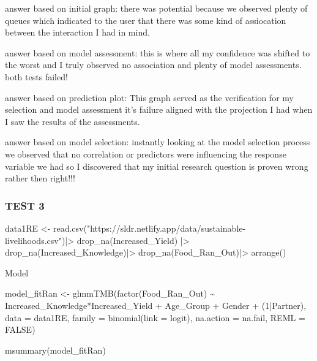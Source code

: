 \documentclass[
]{article}
\newenvironment{Shaded}{\begin{snugshade}}{\end{snugshade}}
\newcommand{\AttributeTok}[1]{\textcolor[rgb]{0.77,0.63,0.00}{#1}}
\newcommand{\ConstantTok}[1]{\textcolor[rgb]{0.00,0.00,0.00}{#1}}
\newcommand{\DecValTok}[1]{\textcolor[rgb]{0.00,0.00,0.81}{#1}}
\newcommand{\FunctionTok}[1]{\textcolor[rgb]{0.00,0.00,0.00}{#1}}
\newcommand{\NormalTok}[1]{#1}
\newcommand{\OtherTok}[1]{\textcolor[rgb]{0.56,0.35,0.01}{#1}}
\newcommand{\SpecialCharTok}[1]{\textcolor[rgb]{0.00,0.00,0.00}{#1}}
\newcommand{\StringTok}[1]{\textcolor[rgb]{0.31,0.60,0.02}{#1}}
\begin{document}
answer based on initial graph: there was potential because we observed
plenty of queues which indicated to the user that there was some kind of
assiocation between the interaction I had in mind.

answer based on model assessment: this is where all my confidence was
shifted to the worst and I truly observed no association and plenty of
model assessments. both tests failed!

answer based on prediction plot: This graph served as the verification
for my selection and model assessment it's failure aligned with the
projection I had when I saw the results of the assessments.

answer based on model selection: instantly looking at the model
selection process we observed that no correlation or predictors were
influencing the response variable we had so I discovered that my initial
research question is proven wrong rather then right!!!

\hypertarget{test-3}{%
\subsubsection{TEST 3}\label{test-3}}

\begin{Shaded}
\begin{Highlighting}[]
\NormalTok{data1RE }\OtherTok{\textless{}{-}} \FunctionTok{read.csv}\NormalTok{(}\StringTok{"https://sldr.netlify.app/data/sustainable{-}livelihoods.csv"}\NormalTok{)}\SpecialCharTok{|\textgreater{}}
  \FunctionTok{drop\_na}\NormalTok{(Increased\_Yield) }\SpecialCharTok{|\textgreater{}}
  \FunctionTok{drop\_na}\NormalTok{(Increased\_Knowledge)}\SpecialCharTok{|\textgreater{}}
  \FunctionTok{drop\_na}\NormalTok{(Food\_Ran\_Out)}\SpecialCharTok{|\textgreater{}}
  \FunctionTok{arrange}\NormalTok{()}
\end{Highlighting}
\end{Shaded}

Model

\begin{Shaded}
\begin{Highlighting}[]
\NormalTok{model\_fitRan }\OtherTok{\textless{}{-}} \FunctionTok{glmmTMB}\NormalTok{(}\FunctionTok{factor}\NormalTok{(Food\_Ran\_Out) }\SpecialCharTok{\textasciitilde{}}\NormalTok{ Increased\_Knowledge}\SpecialCharTok{*}\NormalTok{Increased\_Yield }\SpecialCharTok{+}\NormalTok{ Age\_Group }\SpecialCharTok{+}\NormalTok{ Gender }\SpecialCharTok{+}
\NormalTok{                  (}\DecValTok{1}\SpecialCharTok{|}\NormalTok{Partner), }
                 \AttributeTok{data =}\NormalTok{ data1RE, }
                 \AttributeTok{family =} \FunctionTok{binomial}\NormalTok{(}\AttributeTok{link =} \StringTok{\textquotesingle{}logit\textquotesingle{}}\NormalTok{),}
                 \AttributeTok{na.action =} \StringTok{\textquotesingle{}na.fail\textquotesingle{}}\NormalTok{,}
                 \AttributeTok{REML =} \ConstantTok{FALSE}\NormalTok{)}


\FunctionTok{msummary}\NormalTok{(model\_fitRan)}
\end{Highlighting}
\end{Shaded}
\end{document}
